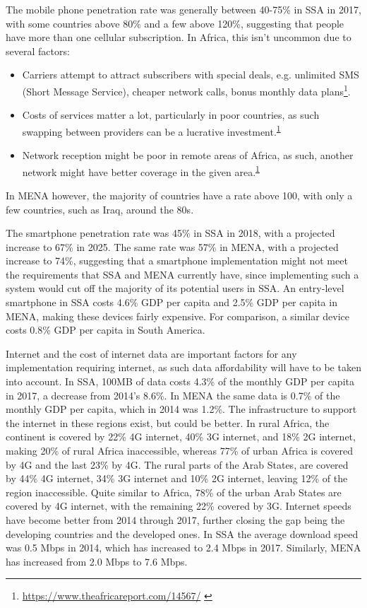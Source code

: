 \documentclass[11pt, a4paper]{article}
\begin{document}
\noindent The mobile phone penetration rate was generally between 40-75\% in SSA in 2017, with some countries above 80\% and a few above 120\%\cite{owidinternet}, suggesting that people have more than one cellular subscription. In Africa, this isn't uncommon due to several factors:
\begin{itemize}
  \item Carriers attempt to attract subscribers with special deals, e.g. unlimited SMS (Short Message Service), cheaper network calls, bonus monthly data plans\footnote{\url{https://www.theafricareport.com/14567/} \label{fn1} }.
  \item Costs of services matter a lot, particularly in poor countries, as such swapping between providers can be a lucrative investment.\textsuperscript{\ref{fn1}}
  \item Network reception might be poor in remote areas of Africa, as such, another network might have better coverage in the given area.\textsuperscript{\ref{fn1}}
\end{itemize}
In MENA however, the majority of countries have a rate above 100, with only a few countries, such as Iraq, around the 80s.

 The smartphone penetration rate was 45\% in SSA in 2018, with a projected increase to 67\% in 2025. The same rate was 57\% in MENA, with a projected increase to 74\%\cite{gsmame}, suggesting that a smartphone implementation might not meet the requirements that SSA and MENA currently have, since implementing such a system would cut off the majority of its potential users in SSA. An entry-level smartphone in SSA costs 4.6\% GDP per capita and 2.5\% GDP per capita in MENA, making these devices fairly expensive. For comparison, a similar device costs 0.8\% GDP per capita in South America\cite{gsma}.

Internet and the cost of internet data are important factors for any implementation requiring internet, as such data affordability will have to be taken into account. In SSA, 100MB of data costs 4.3\% of the monthly GDP per capita in 2017, a decrease from 2014's 8.6\%. In MENA the same data is 0.7\% of the monthly GDP per capita, which in 2014 was 1.2\%\cite{gsma}. The infrastructure to support the internet in these regions exist, but could be better. In rural Africa, the continent is covered by 22\% 4G internet, 40\% 3G internet, and 18\% 2G internet, making 20\% of rural Africa inaccessible, whereas 77\% of urban Africa is covered by 4G and the last 23\% by 4G. The rural parts of the Arab States, are covered by 44\% 4G internet, 34\% 3G internet and 10\% 2G internet, leaving 12\% of the region inaccessible. Quite similar to Africa, 78\% of the urban Arab States are covered by 4G internet, with the remaining 22\% covered by 3G\cite{ituinternet}. Internet speeds have become better from 2014 through 2017, further closing the gap being the developing countries and the developed ones. In SSA the average download speed was 0.5 Mbps in 2014, which has increased to 2.4 Mbps in 2017. Similarly, MENA has increased from 2.0 Mbps to 7.6 Mbps\cite{gsma}.
\end{document}
